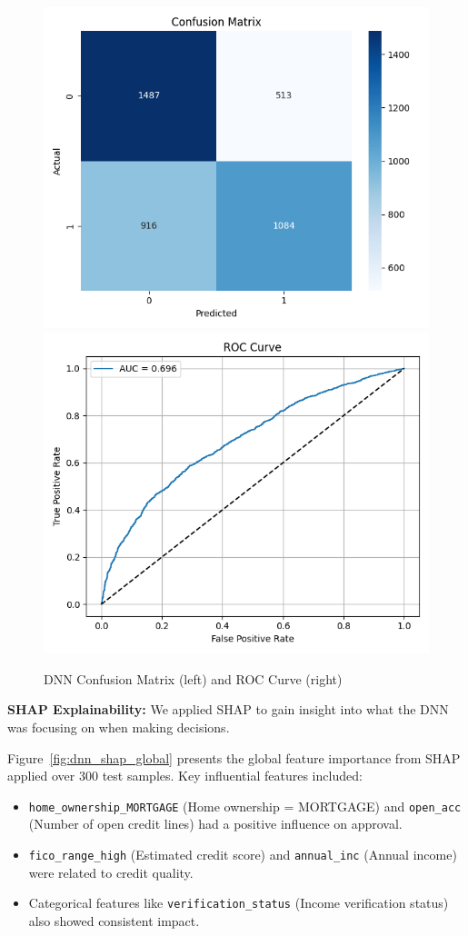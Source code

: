 \begin{figure}[H]
    \centering
    \includegraphics[width=0.47\linewidth]{figures/dnn_confusion_matrix.png}
    \includegraphics[width=0.47\linewidth]{figures/dnn_roc_curve.png}
    \caption{DNN Confusion Matrix (left) and ROC Curve (right)}
    \label{fig:dnn_conf_roc}
\end{figure}
\newpage
\textbf{SHAP Explainability:}  
We applied SHAP to gain insight into what the DNN was focusing on when making decisions.

Figure~\ref{fig:dnn_shap_global} presents the global feature importance from SHAP applied over 300 test samples. Key influential features included:
\begin{itemize}
    \item \texttt{home\_ownership\_MORTGAGE} (Home ownership = MORTGAGE) and \texttt{open\_acc} (Number of open credit lines) had a positive influence on approval.
    \item \texttt{fico\_range\_high} (Estimated credit score) and \texttt{annual\_inc} (Annual income) were related to credit quality.
    \item Categorical features like \texttt{verification\_status} (Income verification status) also showed consistent impact.
\end{itemize}

